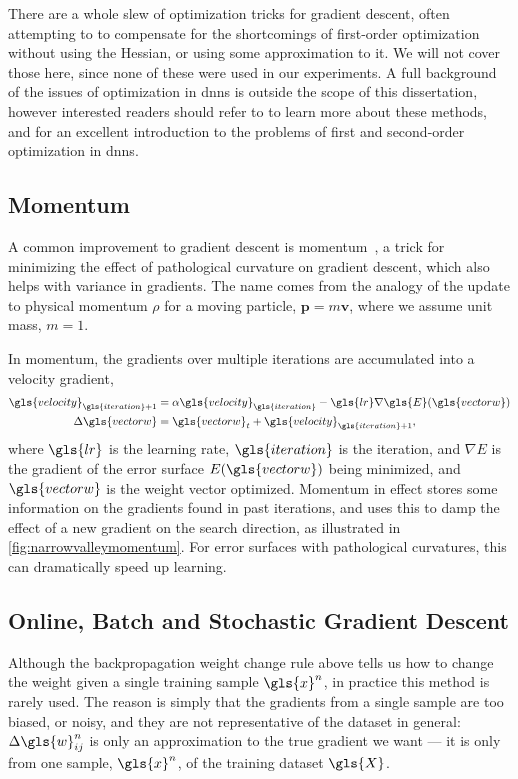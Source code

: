 \documentclass[thesis]{subfiles}
\begin{document}
There are a whole slew of optimization tricks for gradient descent, often attempting to to compensate for the shortcomings of first-order optimization without using the Hessian, or using some approximation to it. We will not cover those here, since none of these were used in our experiments. A full background of the issues of optimization in \glspl{dnn} is outside the scope of this dissertation, however interested readers should refer to \citet{goodfellow2016deep} to learn more about these methods, and \citet{martens2010deep} for an excellent introduction to the problems of first and second-order optimization in \glspl{dnn}.

\subsection{Momentum}
A common improvement to gradient descent is momentum~\citep{polyak1964some,rumelhartbackprop}, a trick for minimizing the effect of pathological curvature on gradient descent, which also helps with variance in gradients. The name comes from the analogy of the update to physical momentum $\rho$ for a moving particle, $\mathbf{p}=m\mathbf{v}$, where we assume unit mass, $m=1$.

In momentum, the gradients over multiple iterations are accumulated into a velocity gradient, 
\begin{equation}
\begin{aligned}
\gls{velocity}_{\gls{iteration}+1} &= \alpha \gls{velocity}_{\gls{iteration}} - \gls{lr}\nabla \gls{E}(\gls{vectorw})\\
\Delta\gls{vectorw} &= \gls{vectorw}_t + \gls{velocity}_{\gls{iteration}+1},
\end{aligned}
\end{equation}
where $\gls{lr}$ is the learning rate, $\gls{iteration}$ is the iteration, and $\nabla E$ is the gradient of the error surface $E(\gls{vectorw})$ being minimized, and $\gls{vectorw}$ is the weight vector optimized. Momentum in effect stores some information on the gradients found in past iterations, and uses this to damp the effect of a new gradient on the search direction, as illustrated in \cref{fig:narrowvalleymomentum}. For error surfaces with pathological curvatures, this can dramatically speed up learning.

\subsection{Online, Batch and Stochastic Gradient Descent}
Although the backpropagation weight change rule above tells us how to change the weight given a single training sample $\gls{x}^n$, in practice this method is rarely used. The reason is simply that the gradients from a single sample are too biased, or noisy, and they are not representative of the dataset in general: $\Delta \gls{w}^n_{ij}$ is only an approximation to the true gradient we want --- it is only from one sample, $\gls{x}^n$, of the training dataset $\gls{X}$. 
\end{document}
